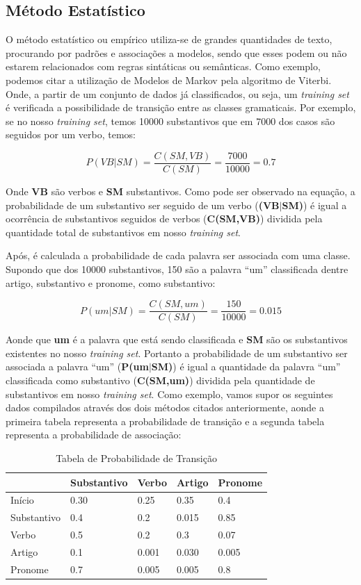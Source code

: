\subsection{Método Estatístico} 
O método estatístico ou empírico utiliza-se de grandes
quantidades de texto, procurando por padrões e
associações a modelos, sendo que esses podem ou não estarem relacionados com
regras sintáticas ou semânticas. Como exemplo, podemos citar a utilização de
Modelos de Markov pela algoritmo de Viterbi. Onde, a partir de um conjunto de
dados já classificados, ou seja, um \textit{training set} é verificada a
possibilidade de transição entre as classes gramaticais.
Por exemplo, se no nosso \textit{training set}, temos 10000 substantivos que em
7000 dos casos são seguidos por um verbo, temos:

\[ P(VB|SM) = \frac{C(SM,VB)}{C(SM)} = \frac{7000}{10000} = 0.7 \]

Onde \textbf{VB} são verbos e \textbf{SM} substantivos. Como pode ser observado
na equação, a probabilidade de um substantivo ser seguido de um verbo
(\textbf{(VB$\vert$SM)}) é igual a ocorrência de substantivos seguidos de verbos (\textbf{C(SM,VB)})
dividida pela quantidade total de substantivos em nosso \textit{training set}.

Após, é calculada a probabilidade de cada palavra ser associada com uma classe.
Supondo que dos 10000 substantivos, 150 são a palavra ``um'' classificada
dentre artigo, substantivo e pronome, como substantivo:

\[ P(um|SM) = \frac{C(SM,um)}{C(SM)} = \frac{150}{10000} = 0.015 \]

Aonde que \textbf{um} é a palavra que está sendo classificada e \textbf{SM}
são os substantivos existentes no nosso \textit{training set}. Portanto a
probabilidade de um substantivo ser associada a palavra ``um''
(\textbf{P(um$\vert$SM)}) é igual a quantidade da palavra ``um''
classificada como substantivo (\textbf{C(SM,um)}) dividida pela quantidade de
substantivos em nosso \textit{training set}.
Como exemplo, vamos supor os seguintes dados compilados através dos dois métodos
citados anteriormente, aonde a primeira tabela representa a probabilidade de
transição e a segunda tabela representa a probabilidade de associação:

\begin{table}[htb]
\centering
\begin{tabular}{|l|l|l|l|l|}
\hline
            & Substantivo & Verbo & Artigo & Pronome \\ \hline
Início      & 0.30        & 0.25  & 0.35   & 0.4     \\ \hline
Substantivo & 0.4         & 0.2   & 0.015  & 0.85    \\ \hline
Verbo       & 0.5         & 0.2   & 0.3    & 0.07    \\ \hline
Artigo      & 0.1         & 0.001 & 0.030  & 0.005   \\ \hline
Pronome     & 0.7         & 0.005 & 0.005  & 0.8     \\ \hline
\end{tabular}
\caption{Tabela de Probabilidade de Transição}
\label{tabela:transicao}
\end{table} 

